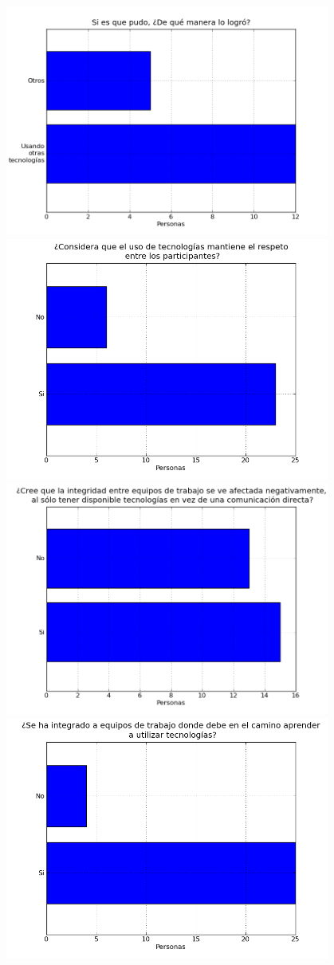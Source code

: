 \begin{center}
	\includegraphics[width=0.8\textwidth]{images/fig11}\\
	\includegraphics[width=0.8\textwidth]{images/fig12}\\
	\includegraphics[width=0.8\textwidth]{images/fig13}\\
	\includegraphics[width=0.8\textwidth]{images/fig14}\\

\end{center}
